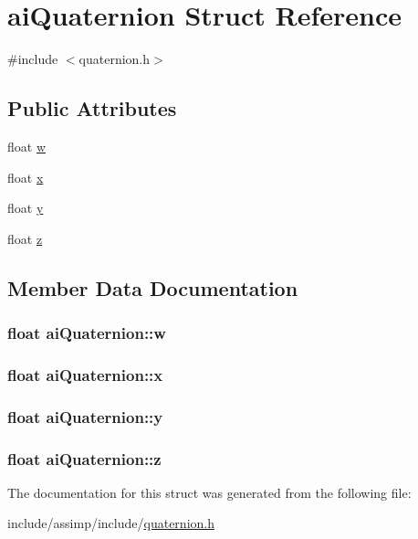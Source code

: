 \hypertarget{structai_quaternion}{\section{ai\-Quaternion Struct Reference}
\label{structai_quaternion}
}


{\ttfamily \#include $<$quaternion.\-h$>$}

\subsection*{Public Attributes}
\begin{DoxyCompactItemize}
\item 
float \hyperlink{structai_quaternion_a410b3c46417d67d728a01a5810907a36}{w}
\item 
float \hyperlink{structai_quaternion_af9db21b086c14d8654d62005f740e75f}{x}
\item 
float \hyperlink{structai_quaternion_a1695fefbc60becf95fcafcc08573ab44}{y}
\item 
float \hyperlink{structai_quaternion_acc30da6103d5131fb1bed6640f1eeda0}{z}
\end{DoxyCompactItemize}


\subsection{Member Data Documentation}
\hypertarget{structai_quaternion_a410b3c46417d67d728a01a5810907a36}{
\subsubsection[{w}]{\setlength{\rightskip}{0pt plus 5cm}float ai\-Quaternion\-::w}}\label{structai_quaternion_a410b3c46417d67d728a01a5810907a36}
\hypertarget{structai_quaternion_af9db21b086c14d8654d62005f740e75f}{
\subsubsection[{x}]{\setlength{\rightskip}{0pt plus 5cm}float ai\-Quaternion\-::x}}\label{structai_quaternion_af9db21b086c14d8654d62005f740e75f}
\hypertarget{structai_quaternion_a1695fefbc60becf95fcafcc08573ab44}{
\subsubsection[{y}]{\setlength{\rightskip}{0pt plus 5cm}float ai\-Quaternion\-::y}}\label{structai_quaternion_a1695fefbc60becf95fcafcc08573ab44}
\hypertarget{structai_quaternion_acc30da6103d5131fb1bed6640f1eeda0}{
\subsubsection[{z}]{\setlength{\rightskip}{0pt plus 5cm}float ai\-Quaternion\-::z}}\label{structai_quaternion_acc30da6103d5131fb1bed6640f1eeda0}


The documentation for this struct was generated from the following file\-:\begin{DoxyCompactItemize}
\item 
include/assimp/include/\hyperlink{quaternion_8h}{quaternion.\-h}\end{DoxyCompactItemize}
